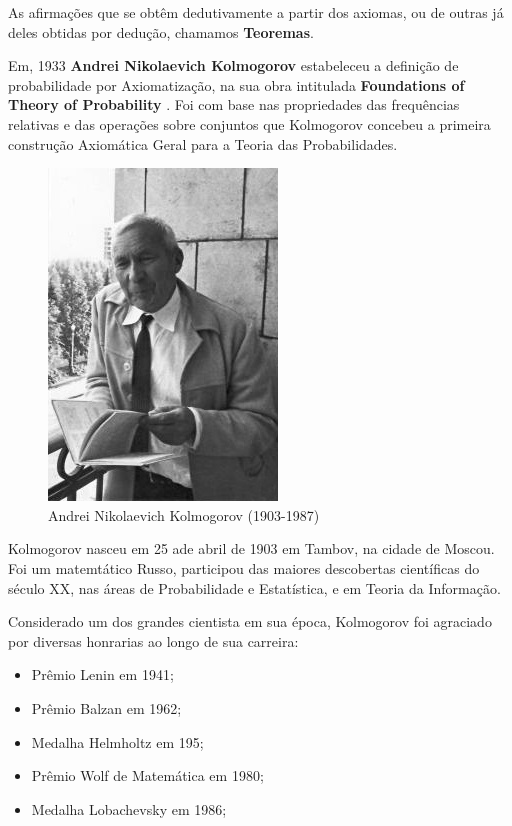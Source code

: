  \inic As afirmações que se obtêm dedutivamente a partir dos axiomas, ou de outras já deles obtidas por dedução, chamamos \textbf{Teoremas}.\vskip0.3cm

 \newpage
 \inic Em, 1933 \textbf{Andrei Nikolaevich Kolmogorov} estabeleceu a definição de probabilidade por Axiomatização, na sua obra intitulada \textbf{Foundations of Theory of Probability} . Foi com base nas propriedades das frequências relativas e das operações sobre conjuntos que Kolmogorov concebeu a primeira construção Axiomática Geral para a Teoria das Probabilidades.


\begin{figure}
    \centering
    \includegraphics[scale=0.5]{figures/Kolmogorov.jpeg}
    \caption{Andrei Nikolaevich Kolmogorov (1903-1987)}
    \label{fig:my_label10}
\end{figure}

Kolmogorov nasceu em 25 ade abril de 1903 em Tambov, na cidade de Moscou. Foi um matemtático Russo, participou das maiores descobertas científicas do século XX, nas áreas de Probabilidade e Estatística, e em Teoria da Informação.\vskip0.3cm

Considerado um dos grandes cientista em sua época, Kolmogorov foi agraciado por diversas honrarias ao longo de sua carreira:

\begin{itemize}
\item Prêmio Lenin em 1941;
\item Prêmio Balzan em 1962;
\item Medalha Helmholtz em 195;
\item Prêmio Wolf de Matemática em 1980;
\item Medalha Lobachevsky em 1986;
\end{itemize}










